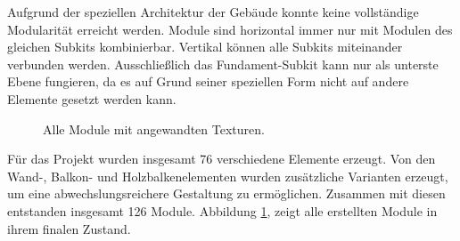 \par
Aufgrund der speziellen Architektur der Gebäude konnte keine vollständige Modularität erreicht werden. Module sind horizontal immer nur mit Modulen des gleichen Subkits kombinierbar. Vertikal können alle Subkits miteinander verbunden werden. Ausschließlich das Fundament-Subkit kann nur als unterste Ebene fungieren, da es auf Grund seiner speziellen Form nicht auf andere Elemente gesetzt werden kann.
\begin{figure}[H]
\centering
  \caption{Alle Module mit angewandten Texturen.}
	\label{alleModule}
\end{figure}
\vspace{-10.5pt}
Für das Projekt wurden insgesamt 76 verschiedene Elemente erzeugt. Von den Wand-, Balkon- und Holzbalkenelementen wurden zusätzliche Varianten erzeugt, um eine abwechslungsreichere Gestaltung zu ermöglichen. Zusammen mit diesen entstanden insgesamt 126 Module. Abbildung \ref{alleModule}, zeigt alle erstellten Module in ihrem finalen Zustand.
\newpage
